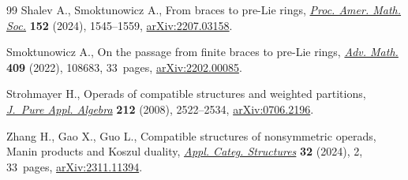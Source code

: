 \begin{thebibliography}{99}
Shalev A., Smoktunowicz A., From braces to pre-{L}ie rings, \href{https://doi.org/10.1090/proc/16693}{\textit{Proc. Amer.
 Math. Soc.}} \textbf{152} (2024), 1545--1559, \href{https://arxiv.org/abs/2207.03158}{arXiv:2207.03158}.

Smoktunowicz A., On the passage from finite braces to pre-{L}ie rings,
 \href{https://doi.org/10.1016/j.aim.2022.108683}{\textit{Adv. Math.}} \textbf{409} (2022), 108683, 33~pages,
 \href{https://arxiv.org/abs/2202.00085}{arXiv:2202.00085}.

Strohmayer H., Operads of compatible structures and weighted partitions,
 \href{https://doi.org/10.1016/j.jpaa.2008.04.009}{\textit{J.~Pure Appl. Algebra}} \textbf{212} (2008), 2522--2534,
 \href{https://arxiv.org/abs/0706.2196}{arXiv:0706.2196}.

Zhang H., Gao X., Guo L., Compatible structures of nonsymmetric operads,
 {M}anin products and {K}oszul duality, \href{https://doi.org/10.1007/s10485-023-09760-x}{\textit{Appl. Categ. Structures}}
 \textbf{32} (2024), 2, 33~pages, \href{https://arxiv.org/abs/2311.11394}{arXiv:2311.11394}.

\end{thebibliography}

